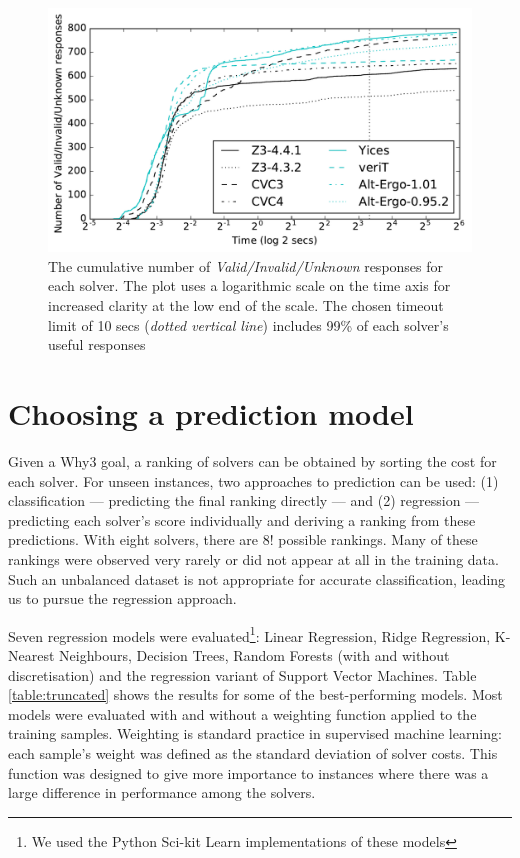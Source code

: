 \documentclass[runningheads,a4paper]{llncs}
\begin{document}
\begin{figure}
\centering
\includegraphics[width=\linewidth]{line_graph}
\caption{The cumulative number of \textit{Valid/Invalid/Unknown} responses for each solver. The plot uses a logarithmic scale on the time axis for increased clarity at the low end of the scale. The chosen timeout limit of 10 secs (\textit{dotted vertical line}) includes 99\% of each solver's useful responses}
\label{fig:line_graph}
\end{figure}

\section{Choosing a prediction model}
\label{sec:predselection}
Given a \textsf{Why3} goal, a ranking of solvers can be obtained by sorting the cost for each solver. For unseen instances, two approaches to prediction can be used: (1) classification --- predicting the final ranking directly --- and (2) regression --- predicting each solver's score individually and deriving a ranking from these predictions.  With eight solvers, there are $8!$ possible rankings. Many of these rankings were observed very rarely or did not appear at all in the training data. Such an unbalanced dataset is not appropriate for accurate classification, leading us to pursue the regression approach.

Seven regression models were evaluated\footnote{We used the Python Sci-kit Learn \cite{sklearn} implementations of these models}: Linear Regression, Ridge Regression, K-Nearest Neighbours, Decision Trees, Random Forests (with and without discretisation) and the regression variant of Support Vector Machines. Table \ref{table:truncated} shows the results for some of the best-performing models. Most models were evaluated with and without a weighting function applied to the training samples. Weighting is standard practice in supervised machine learning: each sample's weight was defined as the standard deviation of solver costs. This function was designed to give more importance to instances where there was a large difference in performance among the solvers. 
\end{document}
